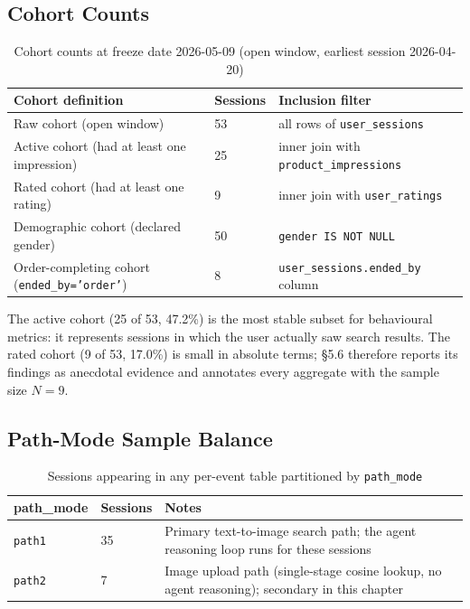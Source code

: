 \subsection{Cohort Counts}
\label{subsec:cohort_counts}

\begin{table}[H]
\centering
\begin{tabular}{p{6.5cm}p{2.0cm}p{4.5cm}}
\toprule
\textbf{Cohort definition} & \textbf{Sessions} & \textbf{Inclusion filter}\\
\midrule
Raw cohort (open window) & 53 & all rows of \texttt{user\_sessions}\\
Active cohort (had at least one impression) & 25 & inner join with \texttt{product\_impressions}\\
Rated cohort (had at least one rating) & 9 & inner join with \texttt{user\_ratings}\\
Demographic cohort (declared gender) & 50 & \texttt{gender IS NOT NULL}\\
Order-completing cohort (\texttt{ended\_by='order'}) & 8 & \texttt{user\_sessions.ended\_by} column\\
\bottomrule
\end{tabular}
\caption{Cohort counts at freeze date 2026-05-09 (open window, earliest session 2026-04-20)}
\label{tab:cohort_counts}
\end{table}

The active cohort (25 of 53, 47.2\%) is the most stable subset for behavioural metrics: it represents sessions in which the user actually saw search results. The rated cohort (9 of 53, 17.0\%) is small in absolute terms; §5.6 therefore reports its findings as anecdotal evidence and annotates every aggregate with the sample size $N=9$.

\subsection{Path-Mode Sample Balance}
\label{subsec:path_balance}

\begin{table}[H]
\centering
\begin{tabular}{p{3cm}p{3cm}p{6cm}}
\toprule
\textbf{path\_mode} & \textbf{Sessions} & \textbf{Notes}\\
\midrule
\texttt{path1} & 35 & Primary text-to-image search path; the agent reasoning loop runs for these sessions\\
\texttt{path2} & 7  & Image upload path (single-stage cosine lookup, no agent reasoning); secondary in this chapter\\
\bottomrule
\end{tabular}
\caption{Sessions appearing in any per-event table partitioned by \texttt{path\_mode}}
\label{tab:path_balance}
\end{table}

